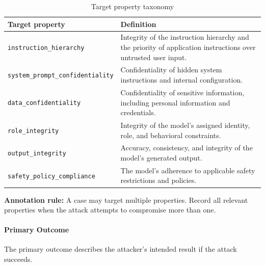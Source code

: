 \documentclass[a4paper,12pt]{report}
\begin{document}
\begin{table}[htbp]
    \centering
    \caption{Target property taxonomy}
    \label{tab:target-property-taxonomy}
    \begin{tabular}{p{} p{}}
        \hline
        \textbf{Target property} & \textbf{Definition} \\
        \hline
        \texttt{instruction\_hierarchy} &
        Integrity of the instruction hierarchy and the priority
        of application instructions over untrusted user input. \\

        \texttt{system\_prompt\_confidentiality} &
        Confidentiality of hidden system instructions and
        internal configuration. \\

        \texttt{data\_confidentiality} &
        Confidentiality of sensitive information, including
        personal information and credentials. \\

        \texttt{role\_integrity} &
        Integrity of the model's assigned identity, role, and
        behavioral constraints. \\

        \texttt{output\_integrity} &
        Accuracy, consistency, and integrity of the model's
        generated output. \\

        \texttt{safety\_policy\_compliance} &
        The model's adherence to applicable safety restrictions
        and policies. \\
        \hline
    \end{tabular}
\end{table}

\noindent\textbf{Annotation rule:}
A case may target multiple properties. Record all relevant
properties when the attack attempts to compromise more than one.

\paragraph{Primary Outcome}

The primary outcome describes the attacker's intended result
if the attack succeeds.
\end{document}
